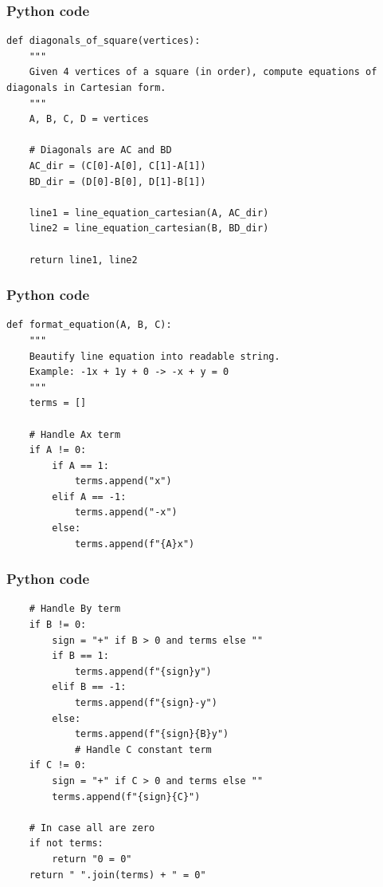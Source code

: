 \documentclass{beamer}
\begin{document}
\begin{frame}[fragile]
    \frametitle{Python code}

    \begin{lstlisting}
def diagonals_of_square(vertices):
    """
    Given 4 vertices of a square (in order), compute equations of diagonals in Cartesian form.
    """
    A, B, C, D = vertices
    
    # Diagonals are AC and BD
    AC_dir = (C[0]-A[0], C[1]-A[1])
    BD_dir = (D[0]-B[0], D[1]-B[1])
    
    line1 = line_equation_cartesian(A, AC_dir)
    line2 = line_equation_cartesian(B, BD_dir)
    
    return line1, line2
    \end{lstlisting}
\end{frame}


\begin{frame}[fragile]
    \frametitle{Python code}

    \begin{lstlisting}
def format_equation(A, B, C):
    """
    Beautify line equation into readable string.
    Example: -1x + 1y + 0 -> -x + y = 0
    """
    terms = []

    # Handle Ax term
    if A != 0:
        if A == 1:
            terms.append("x")
        elif A == -1:
            terms.append("-x")
        else:
            terms.append(f"{A}x")

    \end{lstlisting}
\end{frame}

\begin{frame}[fragile]
    \frametitle{Python code}

    \begin{lstlisting}
    # Handle By term
    if B != 0:
        sign = "+" if B > 0 and terms else ""
        if B == 1:
            terms.append(f"{sign}y")
        elif B == -1:
            terms.append(f"{sign}-y")
        else:
            terms.append(f"{sign}{B}y")
            # Handle C constant term
    if C != 0:
        sign = "+" if C > 0 and terms else ""
        terms.append(f"{sign}{C}")

    # In case all are zero
    if not terms:
        return "0 = 0"
    return " ".join(terms) + " = 0"
    \end{lstlisting}
\end{frame}
\end{document}
